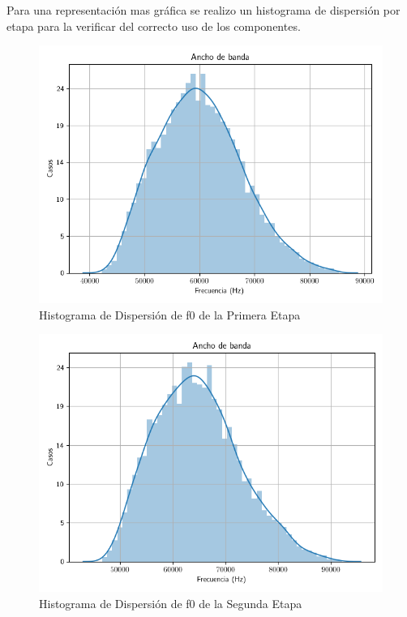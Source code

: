 Para una representación mas gráfica se realizo un histograma de dispersión por etapa para la verificar del correcto uso de los componentes.

\begin{figure}[H]
    \centering
    \includegraphics[scale = 0.5]{../Ejercicio2-DisenoDeCeldas/2CELDARAUCH/Informe/disp1.png}
    \caption{Histograma de Dispersión de f0 de la Primera Etapa}
    \label{ej22dis1}
\end{figure}

\begin{figure}[H]
    \centering
    \includegraphics[scale = 0.5]{../Ejercicio2-DisenoDeCeldas/2CELDARAUCH/Informe/disp2.png}
    \caption{Histograma de Dispersión de f0 de la Segunda Etapa}
    \label{ej22dis1}
\end{figure}


